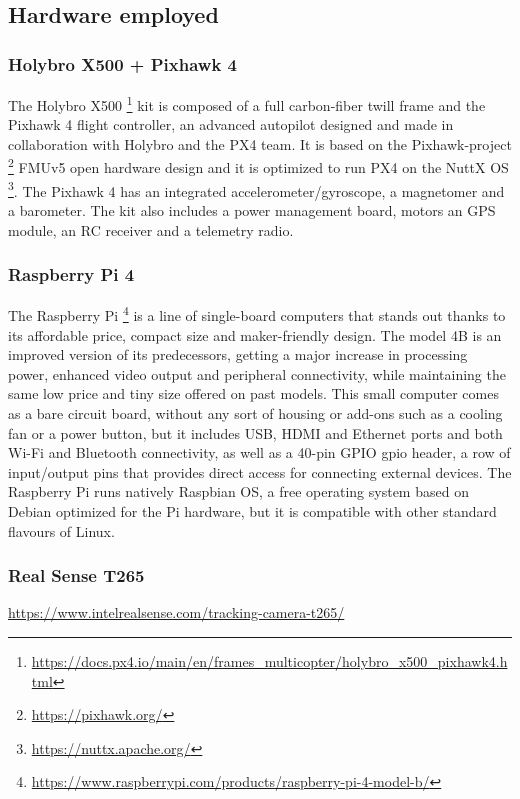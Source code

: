 \subsection{Hardware employed}
\subsubsection{Holybro X500 + Pixhawk 4}
\label{subsec:pixhawk}
The Holybro X500 \footnote{\url{https://docs.px4.io/main/en/frames_multicopter/holybro_x500_pixhawk4.html}} kit is composed of a full carbon-fiber twill frame and the Pixhawk 4 flight controller, 
an advanced autopilot designed and made in collaboration with Holybro and the PX4 team.
It is based on the Pixhawk-project \footnote{\url{https://pixhawk.org/}} FMUv5 open hardware design and it is optimized to run PX4 on the NuttX OS \footnote{\url{https://nuttx.apache.org/}}.
The Pixhawk 4 has an integrated accelerometer/gyroscope, a magnetomer and a barometer.
The kit also includes a power management board, motors an GPS module, an RC receiver and a telemetry radio.


\subsubsection{Raspberry Pi 4}
\label{subsec:rpi}
The Raspberry Pi \footnote{\url{https://www.raspberrypi.com/products/raspberry-pi-4-model-b/}} is a line of single-board computers that stands out thanks to its affordable price,
compact size and maker-friendly design. The model 4B is an improved version of its predecessors,
getting a major increase in processing power, enhanced video output and peripheral connectivity,
while maintaining the same low price and tiny size offered on past models.
This small computer comes as a bare circuit board,
without any sort of housing or add-ons such as a cooling fan or a power button,
but it includes USB, HDMI and Ethernet ports and both Wi-Fi and Bluetooth connectivity,
as well as a 40-pin GPIO \gls{gpio} header, a row of input/output pins that provides direct access for connecting external devices.
The Raspberry Pi runs natively Raspbian OS, a free operating system based on Debian optimized for the Pi hardware, but it is compatible with other standard flavours of Linux.

\subsubsection{Real Sense T265}
\url{https://www.intelrealsense.com/tracking-camera-t265/}